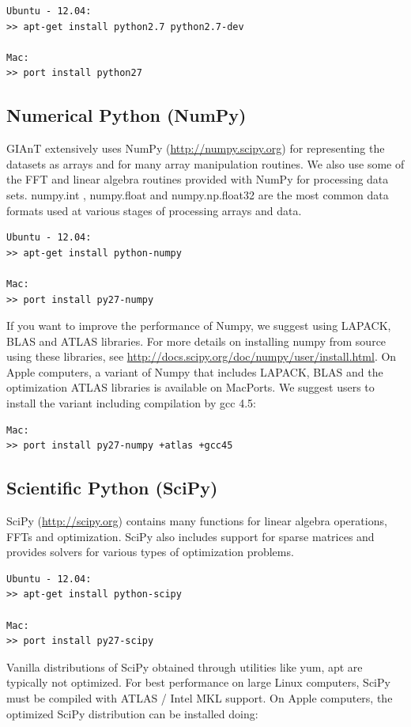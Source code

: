 \begin{verbatim}
Ubuntu - 12.04:
>> apt-get install python2.7 python2.7-dev

Mac:
>> port install python27
\end{verbatim}

\subsection{Numerical Python (NumPy)}
GIAnT extensively uses NumPy (\url{http://numpy.scipy.org}) for representing the datasets as arrays and for many array manipulation routines. We also use some of the FFT and linear algebra routines provided with NumPy for processing data sets. numpy.int , numpy.float and numpy.np.float32 are the most common data formats used at various stages of processing arrays and data. 
\begin{verbatim}
Ubuntu - 12.04:
>> apt-get install python-numpy

Mac:
>> port install py27-numpy
\end{verbatim}

If you want to improve the performance of Numpy, we suggest using LAPACK, BLAS and ATLAS libraries. For more details on installing numpy from source using these libraries, see \url{http://docs.scipy.org/doc/numpy/user/install.html}. On Apple computers, a variant of Numpy that includes LAPACK, BLAS and the optimization ATLAS libraries is available on MacPorts. We suggest users to install the variant including compilation by gcc 4.5:

\begin{verbatim}
Mac:
>> port install py27-numpy +atlas +gcc45
\end{verbatim}

\subsection{Scientific Python (SciPy)}
SciPy (\url{http://scipy.org}) contains many functions for linear algebra operations, FFTs and optimization. SciPy also includes support for sparse matrices and provides solvers for various types of optimization problems. 
\begin{verbatim}
Ubuntu - 12.04:
>> apt-get install python-scipy

Mac:
>> port install py27-scipy
\end{verbatim}

Vanilla distributions of SciPy obtained through utilities like yum, apt are typically not optimized. For best performance on large Linux computers, SciPy must be compiled with ATLAS / Intel MKL support. On Apple computers, the optimized SciPy distribution can be installed doing:

